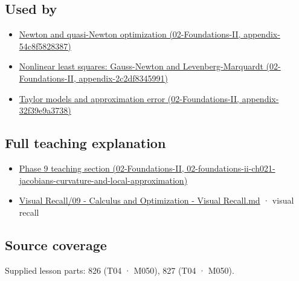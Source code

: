 \subsection{Used by}\label{appendix-6ac071f8b50c-used-by}

\begin{itemize}
\tightlist
\item
  \href{../02-Foundations-II/main.pdf\#nameddest=appendix-54c8f5828387}{Newton and quasi-Newton optimization (02-Foundations-II, appendix-54c8f5828387)}
\item
  \href{../02-Foundations-II/main.pdf\#nameddest=appendix-2c2df8345991}{Nonlinear least squares: Gauss-Newton and Levenberg-Marquardt (02-Foundations-II, appendix-2c2df8345991)}
\item
  \href{../02-Foundations-II/main.pdf\#nameddest=appendix-32f39e9a3738}{Taylor models and approximation error (02-Foundations-II, appendix-32f39e9a3738)}
\end{itemize}

\subsection{Full teaching explanation}\label{appendix-6ac071f8b50c-full-teaching-explanation}

\begin{itemize}
\tightlist
\item
  \href{../02-Foundations-II/main.pdf\#nameddest=02-foundations-ii-ch021-jacobians-curvature-and-local-approximation}{Phase 9 teaching section (02-Foundations-II, 02-foundations-ii-ch021-jacobians-curvature-and-local-approximation)}
\item
  \hyperref[appendix-adf48f5dc5c1]{Visual Recall/09 - Calculus and Optimization - Visual Recall.md} · visual recall
\end{itemize}

\subsection{Source coverage}\label{appendix-6ac071f8b50c-source-coverage}

Supplied lesson parts: 826 (T04 · M050), 827 (T04 · M050).
